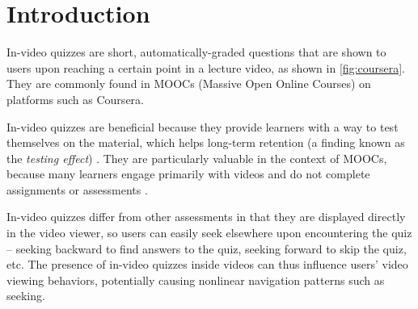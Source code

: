 \documentclass{sigchi}
\begin{document}


\section{Introduction}

In-video quizzes are short, automatically-graded questions that are shown to users upon reaching a certain point in a lecture video, as shown in \autoref{fig:coursera}. They are commonly found in MOOCs (Massive Open Online Courses) on platforms such as Coursera.

In-video quizzes are beneficial because they provide learners with a way to test themselves on the material, which helps long-term retention (a finding known as the \emph{testing effect}) \cite{testingeffect}. They are particularly valuable in the context of MOOCs, because many learners engage primarily with videos and do not complete assignments or assessments \cite{renedisengagement} \cite{ashton}.



In-video quizzes differ from other assessments in that they are displayed directly in the video viewer, so users can easily seek elsewhere upon encountering the quiz -- seeking backward to find answers to the quiz, seeking forward to skip the quiz, etc.
The presence of in-video quizzes inside videos can thus influence users' video viewing behaviors, potentially causing nonlinear navigation patterns such as seeking. %
\end{document}
